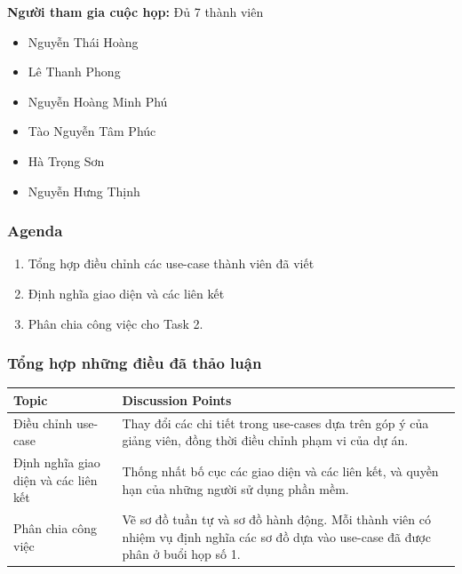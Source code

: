 \textbf{Người tham gia cuộc họp:} Đủ 7 thành viên
\begin{itemize}
  \vspace{-10pt}
  \item Nguyễn Thái Hoàng
  \vspace{-10pt}
  \item Lê Thanh Phong
  \vspace{-10pt}
  \item Nguyễn Hoàng Minh Phú
  \vspace{-10pt}
  \item Tào Nguyễn Tâm Phúc
  \vspace{-10pt}
  \item Hà Trọng Sơn
  \vspace{-10pt}
  \item Nguyễn Hưng Thịnh
\end{itemize}

\subsubsection*{Agenda}
\begin{enumerate}
  \vspace{-10pt}
  \item Tổng hợp điều chỉnh các use-case thành viên đã viết
  \vspace{-10pt}
  \item Định nghĩa giao diện và các liên kết
  \vspace{-10pt}
  \item Phân chia công việc cho Task 2.
\end{enumerate}

\subsubsection*{Tổng hợp những điều đã thảo luận}

\begin{longtable}{|p{4cm}|p{10cm}|}
\hline
\textbf{Topic} & \textbf{Discussion Points} \\
\hline
Điều chỉnh use-case & Thay đổi các chi tiết trong use-cases dựa trên góp ý của giảng viên, đồng thời điều chỉnh phạm vi của dự án. \\
\hline
Định nghĩa giao diện và các liên kết & Thống nhất bố cục các giao diện và các liên kết, và quyền hạn của những người sử dụng phần mềm.\\
\hline
Phân chia công việc & Vẽ sơ đồ tuần tự và sơ đồ hành động. Mỗi thành viên có nhiệm vụ định nghĩa các sơ đồ dựa vào use-case đã được phân ở buổi họp số 1. \\
\hline
\end{longtable}

